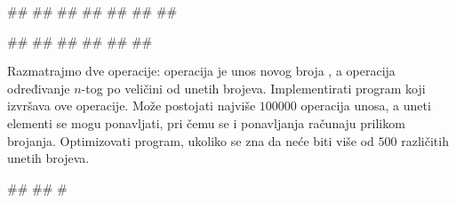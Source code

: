 \begin{Exercise}[label=3_25]
\begin{minitest}
\begin{test}{3}
##
##
##
##
##
##
##

#\naslovIzlaz#
##
##
##
##
##
\end{test}
\end{minitest}

\end{Exercise}

\begin{Answer}[ref=3_25]
\end{Answer}
\begin{Exercise}[difficulty=1, label=3_26]
  Razmatrajmo dve operacije: operacija  je unos novog broja
  , a operacija  određivanje $n$-tog po veličini od
  unetih brojeva. Implementirati program koji izvršava ove
  operacije. Može postojati najviše $100000$ operacija unosa, a uneti
  elementi se mogu ponavljati, pri čemu se i ponavljanja računaju
  prilikom brojanja. Optimizovati program, ukoliko se zna da neće biti
  više od $500$ različitih unetih brojeva. 
  
\begin{maxitest}
\begin{upotreba}{1}
#\naslovInt#
##
#
\end{upotreba}
\end{maxitest}
  
\end{Exercise}

